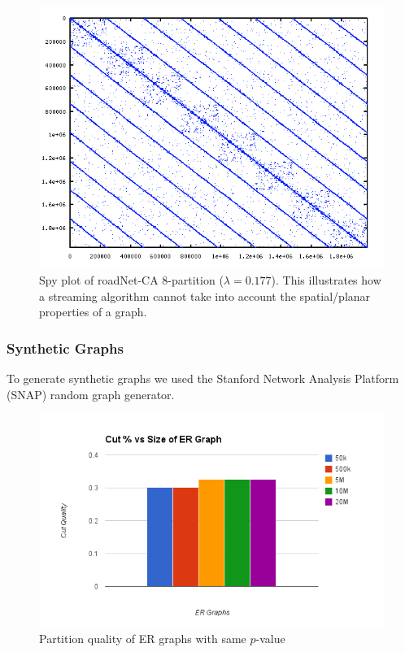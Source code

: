 \begin{figure}[h!]
\centering
\includegraphics[width=0.8\columnwidth] {figures/roadNet-CA8.png}
\caption[Caption for]{Spy plot of roadNet-CA 8-partition ($\lambda=0.177$). This illustrates how a streaming algorithm cannot take into account the spatial/planar properties of a graph.}
\label{fig:4}
\end{figure}

\subsubsection{Synthetic Graphs}
To generate synthetic graphs we used the Stanford Network Analysis Platform (SNAP) random graph generator. 

\begin{figure}[h!]
\centering
  \includegraphics[width=0.8\columnwidth]{figures/lambda_ER.png}
  \caption{Partition quality of ER graphs with same $p$-value}
  \label{fig:lambdaer}
\end{figure}

